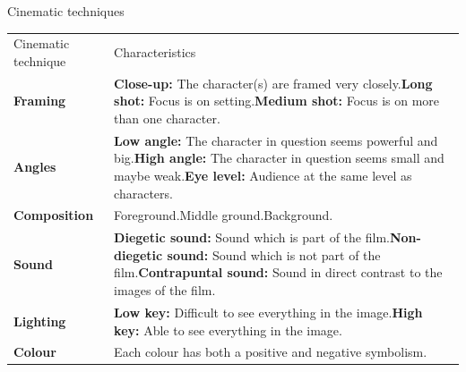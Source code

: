 \documentclass[11pt,a4paper,oneside]{book}
\begin{document}
\clearpage{}\label{note-cinematic-techniques}
{\displayfont\color{navy}\fontsize{30}{34}\selectfont Cinematic techniques\par}\vspace{4mm}

{\small\setlength{\tabcolsep}{4pt}\renewcommand{\arraystretch}{1.3}\begin{tabularx}{\linewidth}{@{}>{\raggedright\arraybackslash}X>{\raggedright\arraybackslash}X@{}}\toprule
Cinematic technique & Characteristics\\
\textbf{Framing} & \textbf{Close-up:} The character(s) are framed very closely.\newline{}\newline{}\textbf{Long shot:} Focus is on setting.\newline{}\newline{}\textbf{Medium shot:} Focus is on more than one character.\\
\textbf{Angles} & \textbf{Low angle:} The character in question seems powerful and big.\newline{}\newline{}\textbf{High angle:} The character in question seems small and maybe weak.\newline{}\newline{}\textbf{Eye level:} Audience at the same level as characters.\\
\textbf{Composition} & Foreground.\newline{}\newline{}Middle ground.\newline{}\newline{}Background.\\
\textbf{Sound} & \textbf{Diegetic sound:} Sound which is part of the film.\newline{}\newline{}\textbf{Non-diegetic sound:} Sound which is not part of the film.\newline{}\newline{}\textbf{Contrapuntal sound:} Sound in direct contrast to the images of the film.\\
\textbf{Lighting} & \textbf{Low key:} Difficult to see everything in the image.\newline{}\newline{}\textbf{High key:} Able to see everything in the image.\\
\textbf{Colour} & Each colour has both a positive and negative symbolism.\\
\bottomrule\end{tabularx}}\par\medskip
\end{document}
